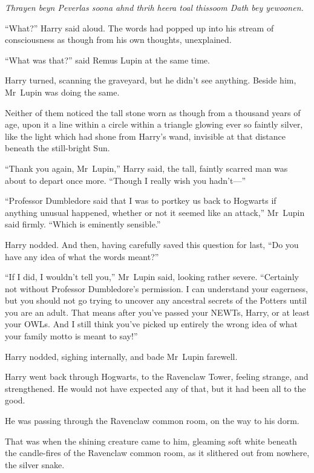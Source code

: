\emph{Thrayen beyn Peverlas soona ahnd thrih heera toal thissoom Dath bey yewoonen.}

“What?” Harry said aloud. The words had popped up into his stream of consciousness as though from his own thoughts, unexplained.

“What was that?” said Remus Lupin at the same time.

Harry turned, scanning the graveyard, but he didn’t see anything. Beside him, Mr~Lupin was doing the same.

Neither of them noticed the tall stone worn as though from a thousand years of age, upon it a line within a circle within a triangle glowing ever so faintly silver, like the light which had shone from Harry’s wand, invisible at that distance beneath the still-bright Sun.


“Thank you again, Mr~Lupin,” Harry said, the tall, faintly scarred man was about to depart once more.
“Though I really wish you hadn’t—”

“Professor Dumbledore said that I was to portkey us back to Hogwarts if anything unusual happened, whether or not it seemed like an attack,” Mr~Lupin said firmly.
“Which is eminently sensible.”

Harry nodded. And then, having carefully saved this question for last,
“Do you have any idea of what the words meant?”

“If I did, I wouldn’t tell you,” Mr~Lupin said, looking rather severe.
“Certainly not without Professor Dumbledore’s permission. I can understand your eagerness, but you should not go trying to uncover any ancestral secrets of the Potters until you are an adult. That means after you’ve passed your NEWTs, Harry, or at least your OWLs. And I still think you’ve picked up entirely the wrong idea of what your family motto is meant to say!”

Harry nodded, sighing internally, and bade Mr~Lupin farewell.

\later

Harry went back through Hogwarts, to the Ravenclaw Tower, feeling strange, and strengthened. He would not have expected any of that, but it had been all to the good.

He was passing through the Ravenclaw common room, on the way to his dorm.

That was when the shining creature came to him, gleaming soft white beneath the candle-fires of the Ravenclaw common room, as it slithered out from nowhere, the silver snake.

